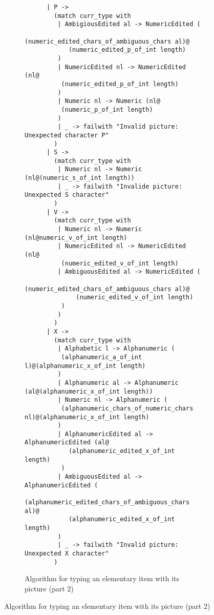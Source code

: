 \documentclass[a4paper,10pt]{article}
\begin{document}
\begin{figure}[!ht]
  \ContinuedFloat
  \begin{subfigure}{1.05\textwidth}
    \begin{verbatim}
      | P ->
        (match curr_type with
         | AmbigiousEdited al -> NumericEdited (
          (numeric_edited_chars_of_ambiguous_chars al)@
            (numeric_edited_p_of_int length)
         )
         | NumericEdited nl -> NumericEdited (nl@
          (numeric_edited_p_of_int length)
         )
         | Numeric nl -> Numeric (nl@
          (numeric_p_of_int length)
         )
         | _ -> failwith "Invalid picture: Unexpected character P"
        )
      | S ->
        (match curr_type with
         | Numeric nl -> Numeric (nl@(numeric_s_of_int length))
         | _ -> failwith "Invalide picture: Unexpected S character"
        )
      | V ->
        (match curr_type with
         | Numeric nl -> Numeric (nl@numeric_v_of_int length)
         | NumericEdited nl -> NumericEdited (nl@
          (numeric_edited_v_of_int length)
         | AmbiguousEdited al -> NumericEdited (
            (numeric_edited_chars_of_ambiguous_chars al)@
              (numeric_edited_v_of_int length)
          )
         )
        )
      | X ->
        (match curr_type with
         | Alphabetic l -> Alphanumeric (
          (alphanumeric_a_of_int l)@(alphanumeric_x_of_int length)
         )
         | Alphanumeric al -> Alphanumeric (al@(alphanumeric_x_of_int length))
         | Numeric nl -> Alphanumeric (
          (alphanumeric_chars_of_numeric_chars nl)@(alphanumeric_x_of_int length)
         )
         | AlphanumericEdited al -> AlphanumericEdited (al@
            (alphanumeric_edited_x_of_int length)
          )
         | AmbiguousEdited al -> AlphanumericEdited (
          (alphanumeric_edited_chars_of_ambiguous_chars al)@
            (alphanumeric_edited_x_of_int length)
         )
         | _ -> failwith "Invalid picture: Unexpected X character"
        )
    \end{verbatim}
    \caption{Algorithm for typing an elementary item with its picture (part 2)}
    \label{fig:algo_typ_elem_pic_2}
  \end{subfigure}
\end{figure}
\end{document}
